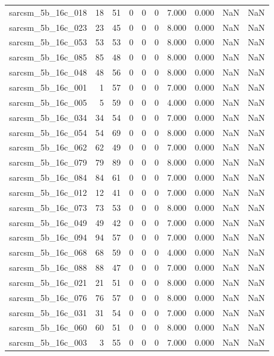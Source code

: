 \documentclass{article}
\begin{document}
\begin{longtable}{lrrrrrrrrr}
sarcsm\_5b\_16c\_018 & 18 & 51 & 0 & 0 & 0 & 7.000 & 0.000 & NaN & NaN \\
sarcsm\_5b\_16c\_023 & 23 & 45 & 0 & 0 & 0 & 8.000 & 0.000 & NaN & NaN \\
sarcsm\_5b\_16c\_053 & 53 & 53 & 0 & 0 & 0 & 8.000 & 0.000 & NaN & NaN \\
sarcsm\_5b\_16c\_085 & 85 & 48 & 0 & 0 & 0 & 8.000 & 0.000 & NaN & NaN \\
sarcsm\_5b\_16c\_048 & 48 & 56 & 0 & 0 & 0 & 8.000 & 0.000 & NaN & NaN \\
sarcsm\_5b\_16c\_001 & 1 & 57 & 0 & 0 & 0 & 7.000 & 0.000 & NaN & NaN \\
sarcsm\_5b\_16c\_005 & 5 & 59 & 0 & 0 & 0 & 4.000 & 0.000 & NaN & NaN \\
sarcsm\_5b\_16c\_034 & 34 & 54 & 0 & 0 & 0 & 7.000 & 0.000 & NaN & NaN \\
sarcsm\_5b\_16c\_054 & 54 & 69 & 0 & 0 & 0 & 8.000 & 0.000 & NaN & NaN \\
sarcsm\_5b\_16c\_062 & 62 & 49 & 0 & 0 & 0 & 7.000 & 0.000 & NaN & NaN \\
sarcsm\_5b\_16c\_079 & 79 & 89 & 0 & 0 & 0 & 8.000 & 0.000 & NaN & NaN \\
sarcsm\_5b\_16c\_084 & 84 & 61 & 0 & 0 & 0 & 7.000 & 0.000 & NaN & NaN \\
sarcsm\_5b\_16c\_012 & 12 & 41 & 0 & 0 & 0 & 7.000 & 0.000 & NaN & NaN \\
sarcsm\_5b\_16c\_073 & 73 & 53 & 0 & 0 & 0 & 8.000 & 0.000 & NaN & NaN \\
sarcsm\_5b\_16c\_049 & 49 & 42 & 0 & 0 & 0 & 7.000 & 0.000 & NaN & NaN \\
sarcsm\_5b\_16c\_094 & 94 & 57 & 0 & 0 & 0 & 7.000 & 0.000 & NaN & NaN \\
sarcsm\_5b\_16c\_068 & 68 & 59 & 0 & 0 & 0 & 4.000 & 0.000 & NaN & NaN \\
sarcsm\_5b\_16c\_088 & 88 & 47 & 0 & 0 & 0 & 7.000 & 0.000 & NaN & NaN \\
sarcsm\_5b\_16c\_021 & 21 & 51 & 0 & 0 & 0 & 8.000 & 0.000 & NaN & NaN \\
sarcsm\_5b\_16c\_076 & 76 & 57 & 0 & 0 & 0 & 8.000 & 0.000 & NaN & NaN \\
sarcsm\_5b\_16c\_031 & 31 & 54 & 0 & 0 & 0 & 7.000 & 0.000 & NaN & NaN \\
sarcsm\_5b\_16c\_060 & 60 & 51 & 0 & 0 & 0 & 8.000 & 0.000 & NaN & NaN \\
sarcsm\_5b\_16c\_003 & 3 & 55 & 0 & 0 & 0 & 7.000 & 0.000 & NaN & NaN \\

\end{longtable}
\end{document}
